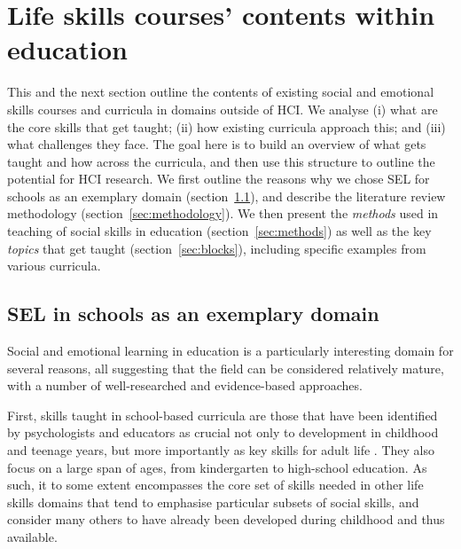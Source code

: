 \documentclass[prodmode,acmtochi]{acmsmall}
\newcommand{\rephrase}[1]{\textrm{\textrm{\textcolor{gray}{#1}}}}
\begin{document}
\section{Life skills courses' contents within education}
\label{sec:SEL}

        This and the next section outline the contents of existing social and emotional skills courses and curricula in domains outside of HCI. We analyse (i) what are the core skills that get taught; (ii) how  existing curricula approach this; and (iii) what challenges they face.    The goal here is to build an overview of what gets taught and how across the curricula, and then use this structure to outline the potential for HCI research. 
%
        We first outline the reasons why we chose SEL for schools as an exemplary domain (section~\ref{sec:reasons}), and describe the literature review methodology (section~\ref{sec:methodology}).
        We then present the \emph{methods} used in teaching of social skills in education (section~\ref{sec:methods})  as well as the key \emph{topics} that  get taught (section~\ref{sec:blocks}), including specific examples from various curricula. 


\subsection{SEL in schools as an exemplary domain}
\label{sec:reasons}
Social and emotional learning in education is a particularly interesting domain for several reasons, all suggesting that the field can be considered relatively mature, with a number of well-researched and evidence-based approaches. 

First, skills taught in school-based curricula are those that have been identified by psychologists and educators as crucial not only to development in childhood and teenage years, but more importantly as key skills for adult life \cite{Greenberg2010}. They also focus on a large span of ages, from kindergarten to high-school education. As such, it to some extent encompasses the core set of skills needed in other life skills domains that tend to emphasise particular subsets of social skills, and consider many others to have already been developed during childhood and thus available. %
\end{document}
